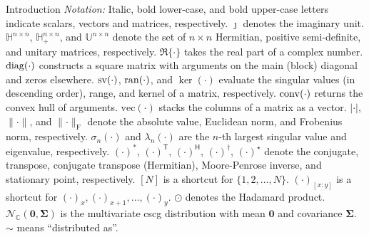 \documentclass[journal]{IEEEtran}
\begin{document}
\begin{section}{Introduction}
	\emph{Notation:}
	Italic, bold lower-case, and bold upper-case letters indicate scalars, vectors and matrices, respectively.
	$\jmath$ denotes the imaginary unit.
	$\mathbb{H}^{n \times n}$, $\mathbb{H}_+^{n \times n}$, and $\mathbb{U}^{n \times n}$ denote the set of $n \times n$ Hermitian, positive semi-definite, and unitary matrices, respectively.
	$\Re\{\cdot\}$ takes the real part of a complex number.
	$\operatorname{diag}(\cdot)$ constructs a square matrix with arguments on the main (block) diagonal and zeros elsewhere.
	$\operatorname{sv}(\cdot)$, $\operatorname{ran}(\cdot)$, and $\ker(\cdot)$ evaluate the singular values (in descending order), range, and kernel of a matrix, respectively.
	$\operatorname{conv}(\cdot)$ returns the convex hull of arguments.
	$\mathrm{vec}(\cdot)$ stacks the columns of a matrix as a vector.
	$\lvert \cdot \rvert$, $\lVert \cdot \rVert$, and $\lVert \cdot \rVert _\mathrm{F}$ denote the absolute value, Euclidean norm, and Frobenius norm, respectively.
	$\sigma_n(\cdot)$ and $\lambda_n(\cdot)$ are the $n$-th largest singular value and eigenvalue, respectively.
	$(\cdot)^*$, $(\cdot)^\mathsf{T}$, $(\cdot)^\mathsf{H}$, $(\cdot)^\dagger$, $(\cdot)^{\star}$ denote the conjugate, transpose, conjugate transpose (Hermitian), Moore-Penrose inverse, and stationary point, respectively.
	$[N]$ is a shortcut for $\{1,2,\ldots,N\}$.
	$(\cdot)_{[x:y]}$ is a shortcut for $(\cdot)_x,(\cdot)_{x+1},\ldots,(\cdot)_y$.
	$\odot$ denotes the Hadamard product.
	$\mathcal{N}_{\mathbb{C}}(\mathbf{0}, \mathbf{\Sigma})$ is the multivariate \gls{cscg} distribution with mean $\mathbf{0}$ and covariance $\mathbf{\Sigma}$.
	$\sim$ means ``distributed as''.
\end{section}
\end{document}
